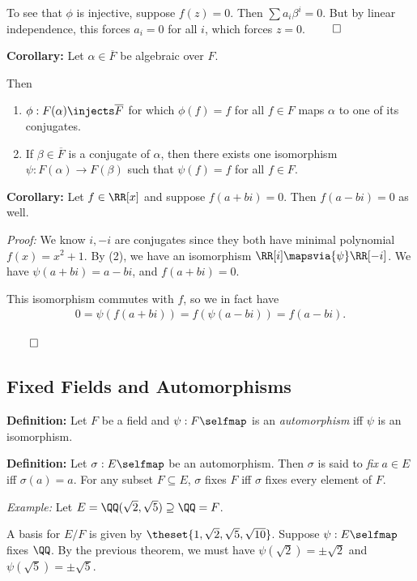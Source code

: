 To see that \(\phi\) is injective, suppose \(f(z) = 0\). Then
\(\sum a_i \beta^i = 0\). But by linear independence, this forces
\(a_i = 0\) for all \(i\), which forces \(z=0\). \(\qed\)

\textbf{Corollary:} Let \(\alpha \in \overline F\) be algebraic over
\(F\).

Then

\begin{enumerate}
\def\labelenumi{\arabic{enumi}.}
\item
  \(\phi: F(\alpha) \injects \overline F\) for which \(\phi(f) = f\) for
  all \(f\in F\) maps \(\alpha\) to one of its conjugates.
\item
  If \(\beta \in \overline F\) is a conjugate of \(\alpha\), then there
  exists one isomorphism \(\psi: F(\alpha) \to F(\beta)\) such that
  \(\psi(f) = f\) for all \(f\in F\).
\end{enumerate}

\textbf{Corollary:} Let \(f \in \RR[x]\) and suppose \(f(a+bi) = 0\).
Then \(f(a - bi) = 0\) as well.

\emph{Proof:} We know \(i, -i\) are conjugates since they both have
minimal polynomial \(f(x) = x^2 + 1\). By (2), we have an isomorphism
\(\RR[i] \mapsvia{\psi} \RR[-i]\). We have \(\psi(a+bi) = a-bi\), and
\(f(a+bi) = 0\).

This isomorphism commutes with \(f\), so we in fact have
\begin{align*}
0 = \psi(f(a+bi)) = f(\psi(a-bi)) = f(a-bi)
.\end{align*}

\(\qed\)

\hypertarget{fixed-fields-and-automorphisms}{%
\subsection{Fixed Fields and
Automorphisms}\label{fixed-fields-and-automorphisms}}

\textbf{Definition:} Let \(F\) be a field and \(\psi: F \selfmap\) is an
\emph{automorphism} iff \(\psi\) is an isomorphism.

\textbf{Definition:} Let \(\sigma: E\selfmap\) be an automorphism. Then
\(\sigma\) is said to \emph{fix} \(a\in E\) iff \(\sigma(a) = a\). For
any subset \(F \subseteq E\), \(\sigma\) fixes \(F\) iff \(\sigma\)
fixes every element of \(F\).

\emph{Example:} Let \(E = \QQ(\sqrt 2, \sqrt 5) \supseteq \QQ = F\).

A basis for \(E/F\) is given by
\(\theset{1, \sqrt 2, \sqrt 5, \sqrt {10}}\). Suppose
\(\psi: E\selfmap\) fixes \(\QQ\). By the previous theorem, we must have
\(\psi(\sqrt 2) = \pm \sqrt 2\) and \(\psi(\sqrt 5) = \pm \sqrt 5\).

